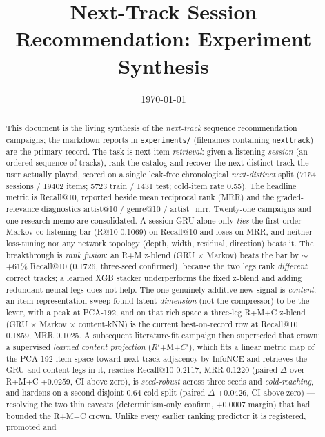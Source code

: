 \documentclass[11pt]{article}
\title{Next-Track Session Recommendation: Experiment Synthesis}
\author{}
\date{\today}
\newcommand{\Rp}{\ensuremath{R'}}
\newcommand{\Cp}{\ensuremath{C'}}
\begin{document}
\maketitle

\begin{abstract}
This document is the living synthesis of the \emph{next-track} sequence
recommendation campaigns; the markdown reports in \texttt{experiments/}
(filenames containing \texttt{nexttrack}) are the primary record. The task is
next-item \emph{retrieval}: given a listening \emph{session} (an ordered
sequence of tracks), rank the catalog and recover the next distinct track the
user actually played, scored on a single leak-free chronological
\emph{next-distinct} split (\num{7154} sessions / \num{19402} items;
\num{5723} train / \num{1431} test; cold-item rate \num{0.55}). The headline
metric is Recall@10, reported beside mean reciprocal rank (MRR) and the
graded-relevance diagnostics artist@10 / genre@10 / artist\_mrr. Twenty-one campaigns and one research memo
are consolidated. A session GRU alone only \emph{ties} the first-order Markov
co-listening bar (R@10 \num{0.1069}) on Recall@10 and loses on MRR, and neither
loss-tuning nor any network topology (depth, width, residual, direction) beats
it. The breakthrough is \emph{rank fusion}: an R+M z-blend (GRU $\times$ Markov)
beats the bar by $\sim$$+61\%$ Recall@10 (\num{0.1726}, three-seed confirmed),
because the two legs rank \emph{different} correct tracks; a learned XGB stacker
underperforms the fixed z-blend and adding redundant neural legs does not help.
The one genuinely additive new signal is \emph{content}: an item-representation
sweep found latent \emph{dimension} (not the compressor) to be the lever, with a
peak at PCA-192, and on that rich space a three-leg R+M+C z-blend
(GRU $\times$ Markov $\times$ content-kNN) is the current best-on-record row at
Recall@10 \num{0.1859}, MRR \num{0.1025}. A subsequent literature-fit campaign
then superseded that crown: a supervised \emph{learned content projection}
(\Rp+M+\Cp), which fits a linear metric map of the PCA-192 item space toward
next-track adjacency by InfoNCE and retrieves the GRU and content legs in it,
reaches Recall@10 \num{0.2117}, MRR \num{0.1220} (paired $\Delta$ over R+M+C
$+\num{0.0259}$, CI above zero), is \emph{seed-robust} across three seeds and
\emph{cold-reaching}, and hardens on a second disjoint 0.64-cold split (paired
$\Delta$ $+\num{0.0426}$, CI above zero) --- resolving the two thin caveats
(determinism-only confirm, $+\num{0.0007}$ margin) that had bounded the R+M+C
crown. Unlike every earlier ranking predictor it is registered, promoted and
$$
\end{abstract}
\end{document}

